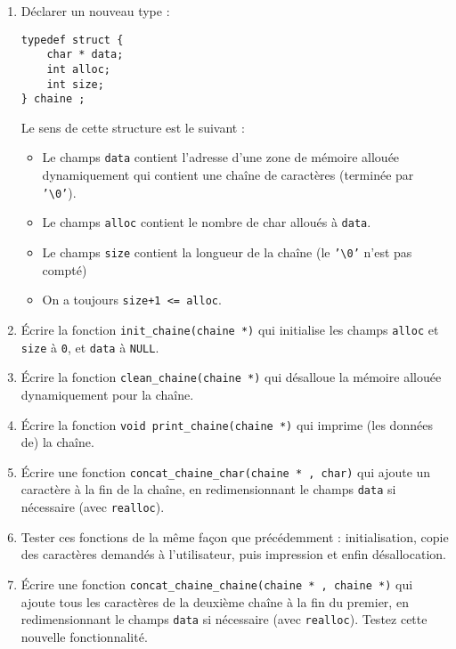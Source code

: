 \documentclass[final, pdftex, a4paper, openbib, ]{article}
\begin{document}
\begin{enumerate}
	\item Déclarer un nouveau type :
			\begin{verbatim}
typedef struct {
	char * data;
	int alloc;
	int size;
} chaine ;
			\end{verbatim}

	Le sens de cette structure est le suivant :
	
	\begin{itemize}
		\item Le champs \texttt{data} contient l'adresse d'une zone de mémoire allouée dynamiquement qui
contient une chaîne de caractères (terminée par \texttt{'\textbackslash{}0'}).
		\item Le champs \texttt{alloc} contient le nombre de char alloués à \texttt{data}.
		\item Le champs \texttt{size} contient la longueur de la chaîne (le \texttt{'\textbackslash{}0'} n'est pas compté)
		\item On a toujours \texttt{size+1 <= alloc}.
	\end{itemize}

	\item Écrire la fonction \texttt{init\_chaine(chaine *)} qui initialise les champs \texttt{alloc} et \texttt{size} à \texttt{0}, et \texttt{data} à \texttt{NULL}.
	\item Écrire la fonction \texttt{clean\_chaine(chaine *)} qui désalloue la mémoire allouée dynamiquement pour la chaîne.
	\item Écrire la fonction \texttt{void print\_chaine(chaine *)} qui imprime (les données de) la chaîne.
	\item Écrire une fonction \texttt{concat\_chaine\_char(chaine * , char)} qui ajoute un caractère à la fin de la chaîne, en redimensionnant le champs \texttt{data} si nécessaire (avec \texttt{realloc}).
	\item Tester ces fonctions de la même façon que précédemment : initialisation, copie des caractères demandés à l'utilisateur, puis impression et enfin désallocation.
	\item Écrire une fonction \texttt{concat\_chaine\_chaine(chaine * , chaine *)} qui ajoute tous les caractères de la deuxième chaîne à la fin du premier, en redimensionnant le champs \texttt{data} si nécessaire (avec \texttt{realloc}).	Testez cette nouvelle fonctionnalité.
	
\end{enumerate}


\end{document}
